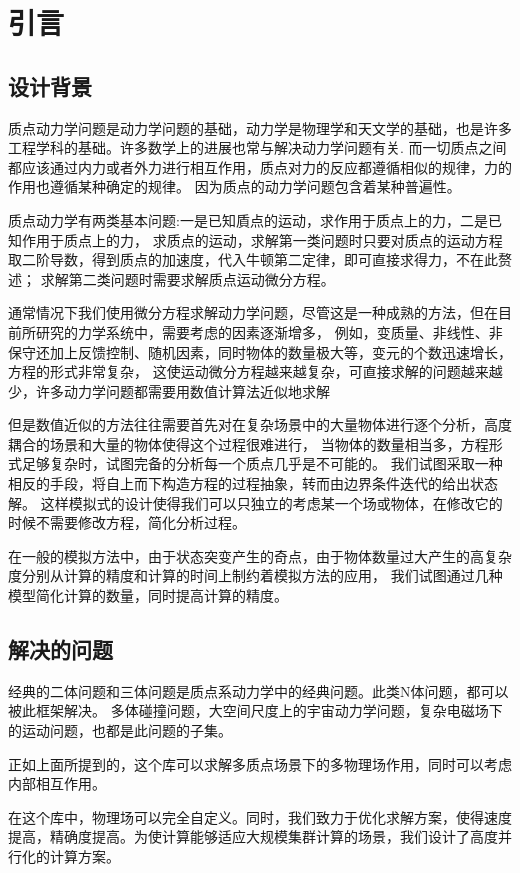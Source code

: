 \chapter{引言}
\section{设计背景}
质点动力学问题是动力学问题的基础，动力学是物理学和天文学的基础，也是许多工程学科的基础。许多数学上的进展也常与解决动力学问题有关.
而一切质点之间都应该通过内力或者外力进行相互作用，质点对力的反应都遵循相似的规律，力的作用也遵循某种确定的规律。
因为质点的动力学问题包含着某种普遍性。


质点动力学有两类基本问题:一是已知貭点的运动，求作用于质点上的力，二是已知作用于质点上的力，
求质点的运动，求解第一类问题时只要对质点的运动方程取二阶导数，得到质点的加速度，代入牛顿第二定律，即可直接求得力，不在此赘述；
求解第二类问题时需要求解质点运动微分方程。


通常情况下我们使用微分方程求解动力学问题，尽管这是一种成熟的方法，但在目前所研究的力学系统中，需要考虑的因素逐渐增多，
例如，变质量、非线性、非保守还加上反馈控制、随机因素，同时物体的数量极大等，变元的个数迅速增长，方程的形式非常复杂，
这使运动微分方程越来越复杂，可直接求解的问题越来越少，许多动力学问题都需要用数值计算法近似地求解


但是数值近似的方法往往需要首先对在复杂场景中的大量物体进行逐个分析，高度耦合的场景和大量的物体使得这个过程很难进行，
当物体的数量相当多，方程形式足够复杂时，试图完备的分析每一个质点几乎是不可能的。
我们试图采取一种相反的手段，将自上而下构造方程的过程抽象，转而由边界条件迭代的给出状态解。
这样模拟式的设计使得我们可以只独立的考虑某一个场或物体，在修改它的时候不需要修改方程，简化分析过程。


在一般的模拟方法中，由于状态突变产生的奇点，由于物体数量过大产生的高复杂度分别从计算的精度和计算的时间上制约着模拟方法的应用，
我们试图通过几种模型简化计算的数量，同时提高计算的精度。


\section{解决的问题}
经典的二体问题和三体问题是质点系动力学中的经典问题。此类N体问题，都可以被此框架解决。
多体碰撞问题，大空间尺度上的宇宙动力学问题，复杂电磁场下的运动问题，也都是此问题的子集。

正如上面所提到的，这个库可以求解多质点场景下的多物理场作用，同时可以考虑内部相互作用。

在这个库中，物理场可以完全自定义。同时，我们致力于优化求解方案，使得速度提高，精确度提高。为使计算能够适应大规模集群计算的场景，我们设计了高度并行化的计算方案。

